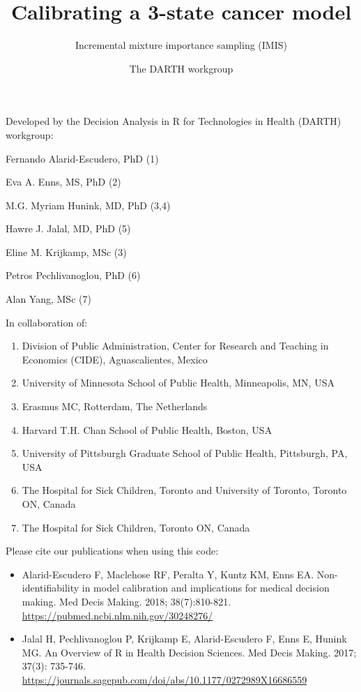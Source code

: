 \documentclass[
]{article}
\title{Calibrating a 3-state cancer model}
\subtitle{Incremental mixture importance sampling (IMIS)}
\author{The DARTH workgroup}
\date{}
\providecommand{\tightlist}{%
  \setlength{\itemsep}{0pt}\setlength{\parskip}{0pt}}
\begin{document}
\maketitle

Developed by the Decision Analysis in R for Technologies in Health
(DARTH) workgroup:

Fernando Alarid-Escudero, PhD (1)

Eva A. Enns, MS, PhD (2)

M.G. Myriam Hunink, MD, PhD (3,4)

Hawre J. Jalal, MD, PhD (5)

Eline M. Krijkamp, MSc (3)

Petros Pechlivanoglou, PhD (6)

Alan Yang, MSc (7)

In collaboration of:

\begin{enumerate}
\def\labelenumi{\arabic{enumi}.}
\tightlist
\item
  Division of Public Administration, Center for Research and Teaching in
  Economics (CIDE), Aguascalientes, Mexico
\item
  University of Minnesota School of Public Health, Minneapolis, MN, USA
\item
  Erasmus MC, Rotterdam, The Netherlands
\item
  Harvard T.H. Chan School of Public Health, Boston, USA
\item
  University of Pittsburgh Graduate School of Public Health, Pittsburgh,
  PA, USA
\item
  The Hospital for Sick Children, Toronto and University of Toronto,
  Toronto ON, Canada
\item
  The Hospital for Sick Children, Toronto ON, Canada
\end{enumerate}

Please cite our publications when using this code:

\begin{itemize}
\item
  Alarid-Escudero F, Maclehose RF, Peralta Y, Kuntz KM, Enns EA.
  Non-identifiability in model calibration and implications for medical
  decision making. Med Decis Making. 2018; 38(7):810-821.
  \url{https://pubmed.ncbi.nlm.nih.gov/30248276/}
\item
  Jalal H, Pechlivanoglou P, Krijkamp E, Alarid-Escudero F, Enns E,
  Hunink MG. An Overview of R in Health Decision Sciences. Med Decis
  Making. 2017; 37(3): 735-746.
  \url{https://journals.sagepub.com/doi/abs/10.1177/0272989X16686559}
\end{itemize}
\end{document}

